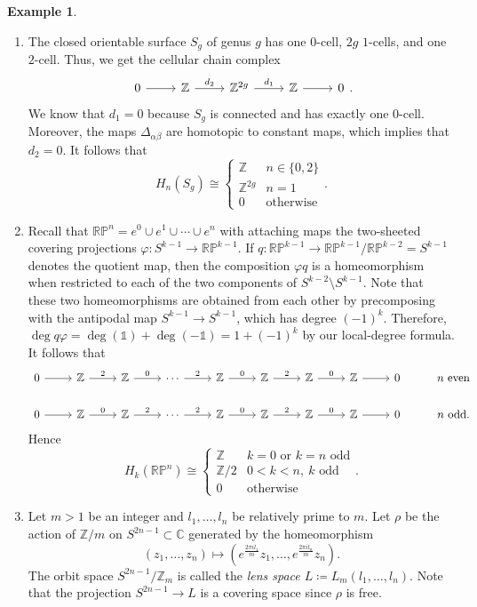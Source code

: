 \documentclass[10pt,letterpaper,cm]{nupset}
\theoremstyle{definition}
\newtheorem{exmp}[definition]{Example}
\theoremstyle{theorem}
\theoremstyle{remark}
\newcommand{\C}{\mathbb C}
\newcommand{\RP}{\mathbb{RP}}
\newcommand{\Z}{\mathbb Z}
\newcommand{\1}{\mathbb{1}}
\newcommand{\0}{\vec 0}
\begin{document}
\begin{exmp} $ $
\begin{enumerate}
\item The closed orientable surface $S_g$ of genus $g$ has one $0$-cell, $2g$ $1$-cells, and one $2$-cell. Thus, we get the cellular chain complex 
\[
\begin{tikzcd}
0 \arrow[r] & \Z \arrow[r, "d_2"] & \Z^{2g} \arrow[r, "d_1"] & \Z \arrow[r] & 0
\end{tikzcd}
.\] We know that $d_1=0$ because $S_g$ is connected and has exactly one $0$-cell. Moreover, the maps $\Delta_{\alpha{\beta}}$ are homotopic to constant maps, which implies that $d_2 =0$. It follows that $$  H_n(S_g) \cong \begin{cases}  \Z & n\in \{0,2\} \\ \Z^{2g} & n =1 \\ 0 & \text{otherwise} \end{cases}  .$$
\item Recall that $\RP^n = e^0 \cup e^1 \cup \cdots \cup e^n$ with attaching maps the two-sheeted covering projections $\varphi : S^{k-1} \to \RP^{k-1}$. If $q : \RP^{k-1} \to \RP^{k-1}/\RP^{k-2} = S^{k-1}$ denotes the quotient map, then the composition $\varphi q$ is a homeomorphism when restricted to each of the two components of $S^{k-2} \setminus S^{k-1}$. Note that these two homeomorphisms are obtained from each other by precomposing with the antipodal map $S^{k-1} \to S^{k-1}$, which has degree $({-}1)^k$. Therefore, $\deg{q\varphi} = \deg(\1)+\deg({-}\1) = 1+({-}1)^k$ by our local-degree formula. It follows that
\[
\begin{tikzcd}
0 \arrow[r] & \Z \arrow[r, "2"] & \Z \arrow[r, "0"] & \cdots \arrow[r, "2"] & \Z \arrow[r, "0"] & \Z \arrow[r, "2"] & \Z \arrow[r, "0"] & \Z \arrow[r] & 0 & n \text{ even} \\
0 \arrow[r] & \Z \arrow[r, "0"] & \Z \arrow[r, "2"] & \cdots \arrow[r, "2"] & \Z \arrow[r, "0"] & \Z \arrow[r, "2"] & \Z \arrow[r, "0"] & \Z \arrow[r] & 0 & n \text{ odd}.
\end{tikzcd}
\] Hence $$ H_k(\RP^n) \cong \begin{cases}   \Z & k=0 \text{ or } k=n \text{ odd} \\ \Z/2 & 0< k<n, \ k \text{ odd}  \\ 0 & \text{otherwise} \end{cases}  .$$
\item Let $m>1$ be an integer and $l_1, \ldots, l_n$ be relatively prime to $m$. Let $\rho$ be the action of $\Z/m$ on $S^{2n-1} \subset \C$ generated by the homeomorphism $$(z_1, \ldots, z_n) \mapsto (e^{\frac{2\pi il_1}{m}}z_1, \ldots, e^{\frac{2\pi il_n}{m}}z_n).$$  The orbit space $S^{2n-1}/\Z_m$ is called the \textit{lens space $L\coloneqq  L_m(l_1, \ldots, l_n)$}. Note that the projection $S^{2n-1} \to L$ is a covering space since $\rho$ is free.
\end{enumerate}

\end{exmp}
\end{document}
